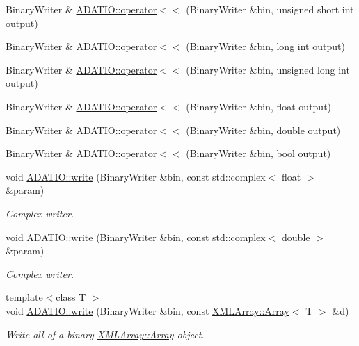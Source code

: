 \begin{DoxyCompactItemize}
\item 
Binary\+Writer \& \mbox{\hyperlink{namespaceADATIO_aff2f4933a66b5468387c2361b16922ce}{A\+D\+A\+T\+I\+O\+::operator$<$$<$}} (Binary\+Writer \&bin, unsigned short int output)
\item 
Binary\+Writer \& \mbox{\hyperlink{namespaceADATIO_a02e2a976b2de62419c11d0a1a112c31e}{A\+D\+A\+T\+I\+O\+::operator$<$$<$}} (Binary\+Writer \&bin, long int output)
\item 
Binary\+Writer \& \mbox{\hyperlink{namespaceADATIO_a669b878c72c25b392c3068a6286e721e}{A\+D\+A\+T\+I\+O\+::operator$<$$<$}} (Binary\+Writer \&bin, unsigned long int output)
\item 
Binary\+Writer \& \mbox{\hyperlink{namespaceADATIO_a9a1401ffe0590b7a54c2690d79073c22}{A\+D\+A\+T\+I\+O\+::operator$<$$<$}} (Binary\+Writer \&bin, float output)
\item 
Binary\+Writer \& \mbox{\hyperlink{namespaceADATIO_a48a968b3177d5e46941cf9a358881c23}{A\+D\+A\+T\+I\+O\+::operator$<$$<$}} (Binary\+Writer \&bin, double output)
\item 
Binary\+Writer \& \mbox{\hyperlink{namespaceADATIO_a3cf019d891bf2265bd3c530f1bdd46a0}{A\+D\+A\+T\+I\+O\+::operator$<$$<$}} (Binary\+Writer \&bin, bool output)
\item 
void \mbox{\hyperlink{namespaceADATIO_a653bde19d92b24f8269adfa361bdabda}{A\+D\+A\+T\+I\+O\+::write}} (Binary\+Writer \&bin, const std\+::complex$<$ float $>$ \&param)
\begin{DoxyCompactList}\small\item\em Complex writer. \end{DoxyCompactList}\item 
void \mbox{\hyperlink{namespaceADATIO_a4d080cdbb3d8b34b2e8cf03001f8b7f0}{A\+D\+A\+T\+I\+O\+::write}} (Binary\+Writer \&bin, const std\+::complex$<$ double $>$ \&param)
\begin{DoxyCompactList}\small\item\em Complex writer. \end{DoxyCompactList}\item 
{\footnotesize template$<$class T $>$ }\\void \mbox{\hyperlink{namespaceADATIO_a70c8ce102a5eca8961bb57bf7b8b6bd1}{A\+D\+A\+T\+I\+O\+::write}} (Binary\+Writer \&bin, const \mbox{\hyperlink{classXMLArray_1_1Array}{X\+M\+L\+Array\+::\+Array}}$<$ T $>$ \&d)
\begin{DoxyCompactList}\small\item\em Write all of a binary \mbox{\hyperlink{classXMLArray_1_1Array}{X\+M\+L\+Array\+::\+Array}} object. \end{DoxyCompactList}\item 

\end{DoxyCompactItemize}
